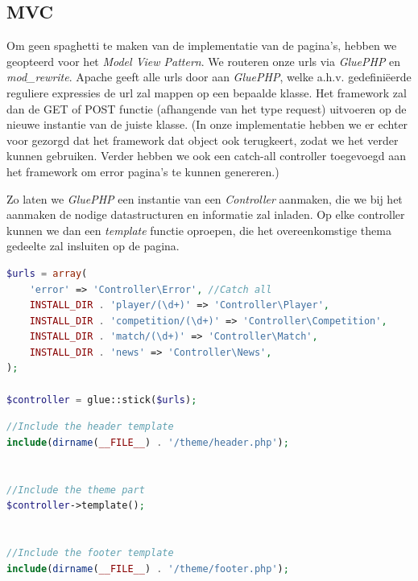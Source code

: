 \documentclass[11pt]{article}
\begin{document}


\subsection{MVC}

Om geen spaghetti te maken van de implementatie van de pagina's, hebben we geopteerd voor het \emph{Model View Pattern}. We routeren onze urls via \emph{GluePHP} en \emph{mod\_rewrite}. Apache geeft alle urls door aan \emph{GluePHP}, welke a.h.v. gedefini\"eerde reguliere expressies de url zal mappen op een bepaalde klasse. Het framework zal dan de GET of POST functie (afhangende van het type request) uitvoeren op de nieuwe instantie van de juiste klasse. (In onze implementatie hebben we er echter voor gezorgd dat het framework dat object ook terugkeert, zodat we het verder kunnen gebruiken. Verder hebben we ook een catch-all controller toegevoegd aan het framework om error pagina's te kunnen genereren.)

Zo laten we \emph{GluePHP} een instantie van een \emph{Controller} aanmaken, die we bij het aanmaken de nodige datastructuren en informatie zal inladen. Op elke controller kunnen we dan een \emph{template} functie oproepen, die het overeenkomstige thema gedeelte zal insluiten op de pagina.


\begin{framed}
\begin{lstlisting}[language=php]
$urls = array(
	'error' => 'Controller\Error', //Catch all
	INSTALL_DIR . 'player/(\d+)' => 'Controller\Player',
	INSTALL_DIR . 'competition/(\d+)' => 'Controller\Competition',
	INSTALL_DIR . 'match/(\d+)' => 'Controller\Match',
	INSTALL_DIR . 'news' => 'Controller\News',
);

$controller = glue::stick($urls);
\end{lstlisting}
\end{framed}


\begin{framed}
\begin{lstlisting}[language=php]
//Include the header template
include(dirname(__FILE__) . '/theme/header.php');


//Include the theme part
$controller->template();


//Include the footer template
include(dirname(__FILE__) . '/theme/footer.php');
\end{lstlisting}
\end{framed}
\end{document}
